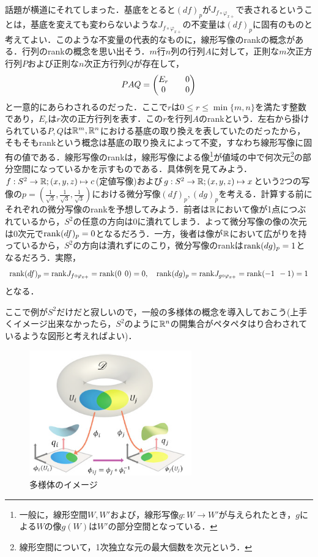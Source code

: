 話題が横道にそれてしまった．基底をとると$(df)_p$が$J_{f\circ\varphi_{x+}}$で表されるということは，基底を変えても変わらないような$J_{f\circ\varphi_{x+}}$の不変量は$(df)_p$に固有のものと考えてよい．このような不変量の代表的なものに，線形写像のrankの概念がある．行列のrankの概念を思い出そう．$m$行$n$列の行列$A$に対して，正則な$m$次正方行列$P$および正則な$n$次正方行列$Q$が存在して，
$$
PAQ=\begin{pmatrix} E_r && 0 \\ 0 && 0 \end{pmatrix}
$$
と一意的にあらわされるのだった．ここで$r$は$0\le r \le \min\{m,n\}$を満たす整数であり，$E_r$は$r$次の正方行列を表す．この$r$を行列$A$のrankという．左右から掛けられている$P,Q$は${\mathbb R}^m,{\mathbb R}^n$における基底の取り換えを表していたのだったから，そもそもrankという概念は基底の取り換えによって不変，すなわち線形写像に固有の値である．線形写像のrankは，線形写像による像\footnote{一般に，線形空間$W,W'$および，線形写像$g:W\rightarrow W'$が与えられたとき，$g$による$W$の像$g(W)$は$W'$の部分空間となっている．}が値域の中で何次元\footnote{線形空間について，1次独立な元の最大個数を次元という．}の部分空間になっているかを示すものである．具体例を見てみよう．$f:S^2\rightarrow{\mathbb R};(x,y,z)\mapsto c$(定値写像)および$g:S^2\rightarrow{\mathbb R};(x,y,z)\mapsto x$という2つの写像の$p=(\frac{1}{\sqrt{3}},\frac{1}{\sqrt{3}},\frac{1}{\sqrt{3}})$における微分写像$(df)_p,(dg)_p$を考える．計算する前にそれぞれの微分写像のrankを予想してみよう．前者は${\mathbb R}$において像が1点につぶれているから，$S^2$の任意の方向は0に潰れてしまう．よって微分写像の像の次元は0次元で${\mathrm{rank}}(df)_p=0$となるだろう．一方，後者は像が${\mathbb R}$において広がりを持っているから，$S^2$の方向は潰れずにのこり，微分写像のrankは${\mathrm{rank}}(dg)_p=1$となるだろう．実際，
$$
{\mathrm{rank}}(df)_p={\mathrm{rank}} J_{f\circ\varphi_{x+}}={\mathrm{rank}}(0\:\:0)=0,\quad{\mathrm{rank}}(dg)_p={\mathrm{rank}} J_{g\circ\varphi_{x+}}={\mathrm{rank}}(-1\:\:-1)=1
$$
となる．


ここで例が$S^2$だけだと寂しいので，一般の多様体の概念を導入しておこう(上手くイメージ出来なかったら，$S^2$のように${\mathbb R}^n$の開集合がペタペタはり合わされているような図形と考えればよい)．
\begin{figure}[h]
  \begin{center} 
    \includegraphics[width=7.0cm]{dev_manifold}
    \caption{多様体のイメージ}
  \end{center}
\end{figure}


